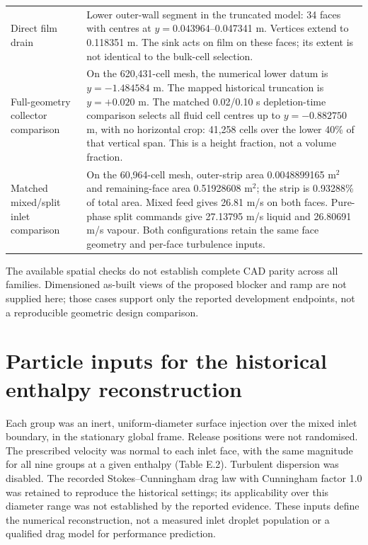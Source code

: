 \begin{longtable}{@{}>{\raggedright\arraybackslash}p{0.29000000\dimexpr\linewidth-2\tabcolsep\relax}>{\raggedright\arraybackslash}p{0.71000000\dimexpr\linewidth-2\tabcolsep\relax}@{}}
Direct film drain & Lower outer-wall segment in the truncated model: 34 faces with centres at \(y=0.043964\)--0.047341 m. Vertices extend to 0.118351 m. The sink acts on film on these faces; its extent is not identical to the bulk-cell selection. \\
Full-geometry collector comparison & On the 620,431-cell mesh, the numerical lower datum is \(y=-1.484584\) m. The mapped historical truncation is \(y=+0.020\) m. The matched 0.02/0.10 s depletion-time comparison selects all fluid cell centres up to \(y=-0.882750\) m, with no horizontal crop: 41,258 cells over the lower 40\% of that vertical span. This is a height fraction, not a volume fraction. \\
Matched mixed/split inlet comparison & On the 60,964-cell mesh, outer-strip area 0.0048899165 m\(^2\) and remaining-face area 0.51928608 m\(^2\); the strip is 0.93288\% of total area. Mixed feed gives 26.81 m/s on both faces. Pure-phase split commands give 27.13795 m/s liquid and 26.80691 m/s vapour. Both configurations retain the same face geometry and per-face turbulence inputs. \\
\bottomrule
\end{longtable}

The available spatial checks do not establish complete CAD parity across all families. Dimensioned as-built views of the proposed blocker and ramp are not supplied here; those cases support only the reported development endpoints, not a reproducible geometric design comparison.

\section{Particle inputs for the historical enthalpy reconstruction}

Each group was an inert, uniform-diameter surface injection over the mixed inlet boundary, in the stationary global frame. Release positions were not randomised. The prescribed velocity was normal to each inlet face, with the same magnitude for all nine groups at a given enthalpy (Table E.2). Turbulent dispersion was disabled. The recorded Stokes--Cunningham drag law with Cunningham factor 1.0 was retained to reproduce the historical settings; its applicability over this diameter range was not established by the reported evidence. These inputs define the numerical reconstruction, not a measured inlet droplet population or a qualified drag model for performance prediction.

